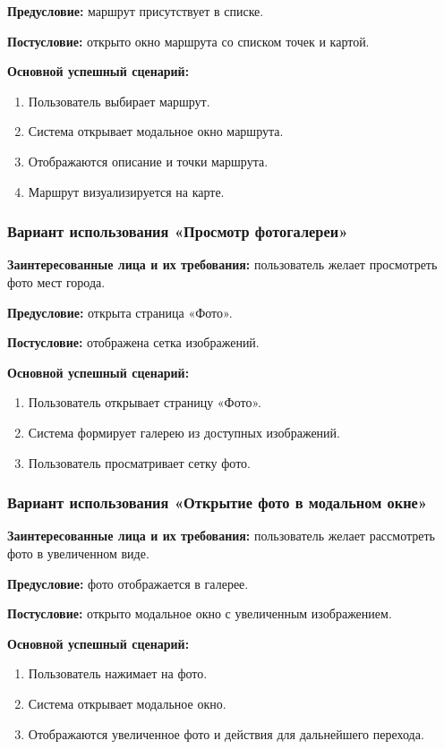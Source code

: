 \textbf{Предусловие:} маршрут присутствует в списке.

\textbf{Постусловие:} открыто окно маршрута со списком точек и картой.

\textbf{Основной успешный сценарий:}
\begin{enumerate}
	\item Пользователь выбирает маршрут.
	\item Система открывает модальное окно маршрута.
	\item Отображаются описание и точки маршрута.
	\item Маршрут визуализируется на карте.
\end{enumerate}

\subsubsection{Вариант использования «Просмотр фотогалереи»}
\textbf{Заинтересованные лица и их требования:} пользователь желает просмотреть фото мест города.

\textbf{Предусловие:} открыта страница «Фото».

\textbf{Постусловие:} отображена сетка изображений.

\textbf{Основной успешный сценарий:}
\begin{enumerate}
	\item Пользователь открывает страницу «Фото».
	\item Система формирует галерею из доступных изображений.
	\item Пользователь просматривает сетку фото.
\end{enumerate}

\subsubsection{Вариант использования «Открытие фото в модальном окне»}
\textbf{Заинтересованные лица и их требования:} пользователь желает рассмотреть фото в увеличенном виде.

\textbf{Предусловие:} фото отображается в галерее.

\textbf{Постусловие:} открыто модальное окно с увеличенным изображением.

\textbf{Основной успешный сценарий:}
\begin{enumerate}
	\item Пользователь нажимает на фото.
	\item Система открывает модальное окно.
	\item Отображаются увеличенное фото и действия для дальнейшего перехода.
\end{enumerate}

